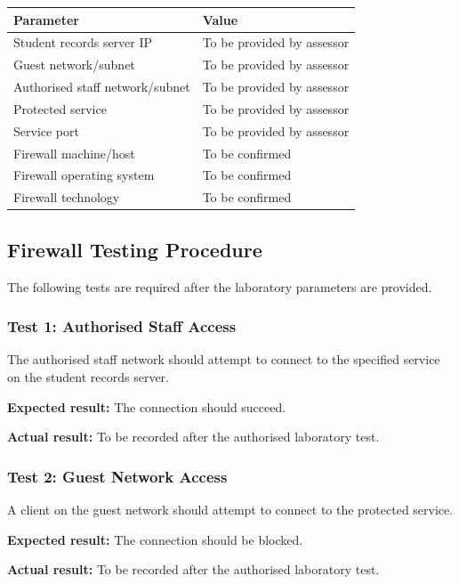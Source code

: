 \documentclass[12pt,a4paper]{article}
\begin{document}
\begin{center}
\begin{tabular}{|p{6cm}|p{7cm}|}
\hline
\textbf{Parameter} & \textbf{Value} \\
\hline
Student records server IP & To be provided by assessor \\
\hline
Guest network/subnet & To be provided by assessor \\
\hline
Authorised staff network/subnet & To be provided by assessor \\
\hline
Protected service & To be provided by assessor \\
\hline
Service port & To be provided by assessor \\
\hline
Firewall machine/host & To be confirmed \\
\hline
Firewall operating system & To be confirmed \\
\hline
Firewall technology & To be confirmed \\
\hline
\end{tabular}
\end{center}

\subsection{Firewall Testing Procedure}

The following tests are required after the laboratory parameters are provided.

\subsubsection{Test 1: Authorised Staff Access}

The authorised staff network should attempt to connect to the specified service on the student records server.

\textbf{Expected result:} The connection should succeed.

\textbf{Actual result:} To be recorded after the authorised laboratory test.

\subsubsection{Test 2: Guest Network Access}

A client on the guest network should attempt to connect to the protected service.

\textbf{Expected result:} The connection should be blocked.

\textbf{Actual result:} To be recorded after the authorised laboratory test.
\end{document}
